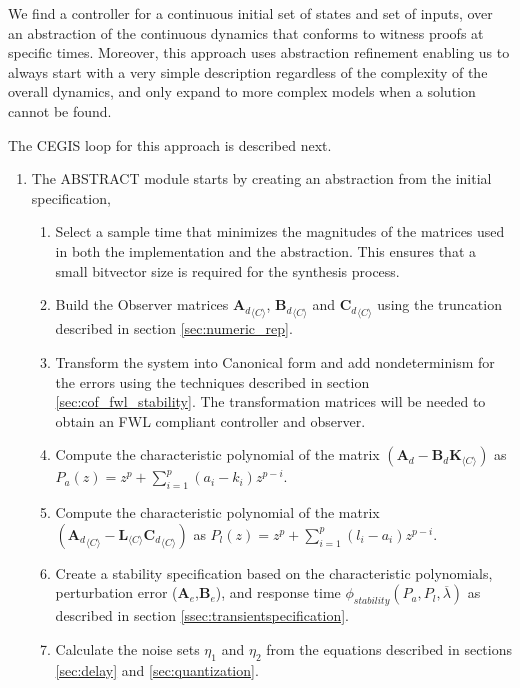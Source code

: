 \documentclass[sigconf]{llncs}
\newcommand{\mat}[1]{\boldsymbol{#1}}
\begin{document}

We find a controller for a continuous initial set of states and set of inputs,
over an abstraction of the continuous dynamics \cite{cattaruzza2015unbounded}
that conforms to witness proofs at specific times.
Moreover, this approach uses abstraction refinement enabling us to always
start with a very simple description regardless of the complexity of the
overall dynamics, and only expand to more complex models when a solution
cannot be found.

The CEGIS loop for this approach is described next.

\begin{enumerate}
\item 
The {\sc ABSTRACT} module starts by creating an abstraction from the initial specification,
\begin{enumerate}
\item Select a sample time that minimizes the magnitudes of the matrices used in both the
implementation and the abstraction. This ensures that a small bitvector size is required for
the synthesis process.
\item Build the Observer matrices ${\mat{A}_d}_{\langle C \rangle}$, ${\mat{B}_d}_{\langle C \rangle}$
and ${\mat{C}_d}_{\langle C \rangle}$ using the truncation described in section \ref{sec:numeric_rep}.
\item Transform the system into Canonical form and add nondeterminism for the errors
using the techniques described in section \ref{sec:cof_fwl_stability}. The transformation
matrices will be needed to obtain an FWL compliant controller and observer.
\item Compute the characteristic polynomial of the matrix $(\mat{A}_d-\mat{B}_d\mat{K}_{\langle C \rangle})$
as $P_a(z) = z^p+\sum_{i=1}^p{(a_i-k_i)z^{p-i}}$. 
\item Compute the characteristic polynomial of the matrix $({\mat{A}_d}_{\langle C \rangle}-\mat{L}_{\langle C \rangle}{\mat{C}_d}_{\langle C \rangle})$
as $P_l(z) = z^p+\sum_{i=1}^p{(l_i-a_i)z^{p-i}}$. 
\item Create a stability specification based on the characteristic polynomials, perturbation
error ($\mat{A}_e$,$\mat{B}_e$), and response time $\phi_{stability}(P_a,P_l,\overline{\lambda})$
as described in section \ref{ssec:transientspecification}.
\item Calculate the noise sets $\eta_1$ and $\eta_2$ from the equations
described in sections \ref{sec:delay} and \ref{sec:quantization}.

\end{enumerate}
\end{enumerate}
\end{document}
